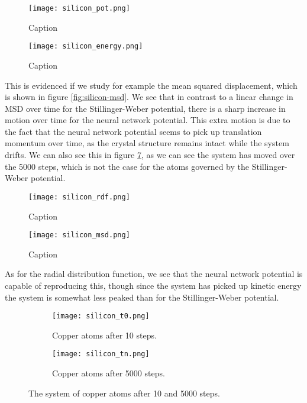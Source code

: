 \begin{figure}[H]
    \centering
    \texttt{[image: silicon\_pot.png]}
    \caption{Caption}
    \label{fig:silicon-pot}
\end{figure}

\begin{figure}[H]
    \centering
    \texttt{[image: silicon\_energy.png]}
    \caption{Caption}
    \label{fig:silicon-energy}
\end{figure}

This is evidenced if we study for example the mean squared displacement,
which is shown in figure \ref{fig:silicon-msd}. We see that in contrast
to a linear change in MSD over time for the Stillinger-Weber potential,
there is a sharp increase in motion over time for the neural network potential.
This extra motion is due to the fact that the neural network potential
seems to pick up translation momentum over time, as the crystal structure
remains intact while the system drifts.
We can also see this in figure \ref{fig:silicon_sw},
as we can see the system has moved over the 5000 steps,
which is not the case for the atoms governed by the Stillinger-Weber potential.

\begin{figure}[H]
    \centering
    \texttt{[image: silicon\_rdf.png]}
    \caption{Caption}
    \label{fig:silicon-rdf}
\end{figure}
\begin{figure}[H]
    \centering
    \texttt{[image: silicon\_msd.png]}
    \caption{Caption}
    \label{fig:silicon-energy}
\end{figure}

As for the radial distribution function, we see that the neural network
potential is capable of reproducing this, though since the system
has picked up kinetic energy the system is somewhat less peaked than
for the Stillinger-Weber potential.

\begin{figure}[H]
\begin{adjustbox}{max width=1.2\linewidth,center}
\centering
  \begin{subfigure}[b]{0.55\textwidth}
      \texttt{[image: silicon\_t0.png]}
      \caption{Copper atoms after 10 steps.}
    \label{fig:f1}
  \end{subfigure}
  \hfill
  \begin{subfigure}[b]{0.55\textwidth}
      \texttt{[image: silicon\_tn.png]}
      \caption{Copper atoms after 5000 steps.}
    \label{fig:f2}
  \end{subfigure}
\end{adjustbox}
    \caption{The system of copper atoms after 10 and 5000 steps.}
    \label{fig:silicon_sw}
\end{figure}

